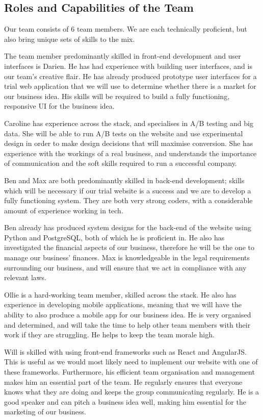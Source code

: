 \documentclass[10pt,a4paper]{article}
\begin{document}
\subsection*{Roles and Capabilities of the Team}

Our team consists of 6 team members. We are each technically proficient, but also bring unique sets of skills to the mix.

The team member predominantly skilled in front-end development and user interfaces is Darien. He has had experience with building user interfaces, and is our team's creative flair. He has already produced prototype user interfaces for a trial web application that we will use to determine whether there is a market for our business idea. His skills will be required to build a fully functioning, responsive UI for the business idea.

Caroline has experience across the stack, and specialises in A/B testing and big data. She will be able to run A/B tests on the website and use experimental design in order to make design decisions that will maximise conversion. She has experience with the workings of a real business, and understands the importance of communication and the soft skills required to run a successful company.

Ben and Max are both predominantly skilled in back-end development; skills which will be necessary if our trial website is a success and we are to develop a fully functioning system. They are both very strong coders, with a considerable amount of experience working in tech.

Ben already has produced system designs for the back-end of the website using Python and PostgreSQL, both of which he is proficient in. He also has investigated the financial aspects of our business, therefore he will be the one to manage our business' finances. Max is knowledgeable in the legal requirements surrounding our business, and will ensure that we act in compliance with any relevant laws.

Ollie is a hard-working team member, skilled across the stack. He also has experience in developing mobile applications, meaning that we will have the ability to also produce a mobile app for our business idea. He is very organised and determined, and will take the time to help other team members with their work if they are struggling. He helps to keep the team morale high.

Will is skilled with using front-end frameworks such as React and AngularJS. This is useful as we would most likely need to implement our website with one of these frameworks. Furthermore, his efficient team organisation and management makes him an essential part of the team. He regularly ensures that everyone knows what they are doing and keeps the group communicating regularly. He is a good speaker and can pitch a business idea well, making him essential for the marketing of our business.
\end{document}
